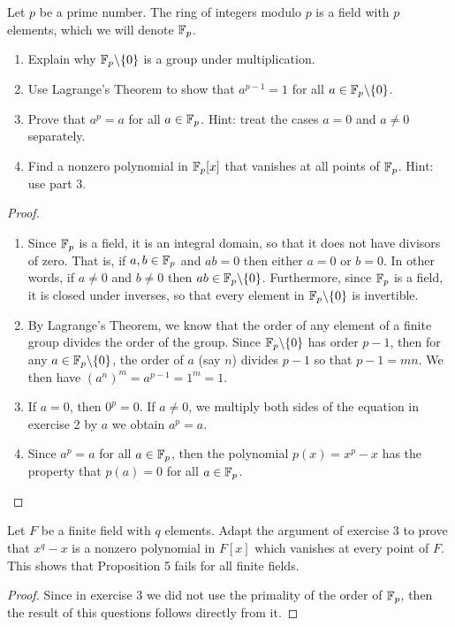 \begin{exercise}{3}
Let $p$ be a prime number. The ring of integers modulo $p$ is a field with $p$ elements, which we will denote $\mathbb{F}_p$.
\begin{enumerate}
    \item Explain why $\mathbb{F}_p\backslash\{0\}$ is a group under multiplication.
    \item Use Lagrange's Theorem to show that $a^{p-1}=1$ for all $a\in \mathbb{F}_p\backslash\{0\}$.
    \item Prove that $a^p=a$ for all $a\in\mathbb{F}_p$. Hint: treat the cases $a=0$ and $a\neq 0$ separately.
    \item Find a nonzero polynomial in $\mathbb{F}_p[x]$ that vanishes at all points of $\mathbb{F}_p$. Hint: use part 3.
\end{enumerate}
\end{exercise}
\begin{proof}
 \begin{enumerate}
     \item Since $\mathbb{F}_p$ is a field, it is an integral domain, so that it does not have divisors of zero. That is, if $a,b\in\mathbb{F}_p$ and $ab=0$ then either $a=0$ or $b=0$. In other words, if $a\neq 0$ and $b\neq 0$ then $ab\in\mathbb{F}_p\backslash\{0\}$. Furthermore, since $\mathbb{F}_p$  is a field, it is closed under inverses, so that every element in $\mathbb{F}_p\backslash\{0\}$ is invertible.
     \item By Lagrange's Theorem, we know that the order of any element of a finite group divides the order of the group. Since $\mathbb{F}_p\backslash\{0\}$ has order $p-1$, then for any $a\in\mathbb{F}_p\backslash\{0\}$, the order of $a$ (say $n$) divides $p-1$ so that $p-1=mn$. We then have $(a^n)^m=a^{p-1}=1^m=1$.
     \item If $a=0$, then $0^p=0$. If $a\neq 0$, we multiply both sides of the equation in exercise 2 by $a$ we obtain $a^p=a$.
     \item Since $a^p=a$ for all $a\in\mathbb{F}_p$, then the polynomial $p(x)=x^p-x$ has the property that $p(a)=0$ for all $a\in\mathbb{F}_p$.
 \end{enumerate}
\end{proof}

\begin{exercise}{4}
Let $F$ be a finite field with $q$ elements. Adapt the argument of exercise 3 to prove that $x^q-x$ is a nonzero polynomial in $F[x]$ which vanishes at every point of $F$. This shows that Proposition 5 fails for all finite fields.
\end{exercise}
\begin{proof}
 Since in exercise 3 we did not use the primality of the order of $\mathbb{F}_p$, then the result of this questions follows directly from it.
\end{proof}

